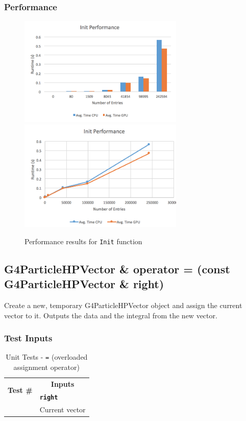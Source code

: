 \documentclass[12pt]{article}
\newcounter{TestCounter}
\begin{document}
	\subsubsection{Performance}
    	\begin{figure}[H]
    	\centering
    	\caption{Performance results for \texttt{Init} function}\label{figPerformanceInit}
    	\includegraphics[width=0.7\textwidth]{init_bar.png}
    	\includegraphics[width=0.7\textwidth]{init_line.png}
   		\end{figure}

\subsection{G4ParticleHPVector \& operator = (const G4ParticleHPVector \& right)}
	Create a new, temporary G4ParticleHPVector object and assign the current vector to it. Outputs the data and the integral from the new vector.

	\subsubsection{Test Inputs}
		\begin{table}[H]
		\centering
		\caption{Unit Tests - \texttt{=} (overloaded assignment operator)}\label{OperatorEquals_unit}
		\begin{tabular}{cl}
		\toprule
		\multirow{2}{*}{\bf Test \#}  & \multicolumn{1}{c}{\bf Inputs}\\
		& \bf \texttt{right}\\\midrule
		{TestCounter}\arabic{TestCounter}\label{OperatorEquals_0} & Current vector\\
		\bottomrule
		\end{tabular}
		\end{table}
\end{document}

